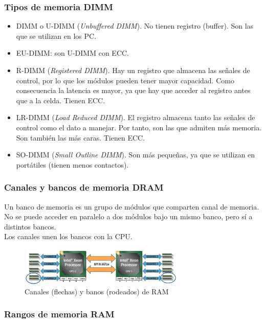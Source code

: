 \documentclass[12pt,spanish]{article}
\begin{document}
\subsubsection{Tipos de memoria DIMM}

\begin{itemize}
	\item DIMM o U-DIMM (\textit{Unbuffered DIMM}). No tienen registro (buffer). Son las que se utilizan en los PC.
	\item EU-DIMM: son U-DIMM con ECC.
	\item R-DIMM (\textit{Registered DIMM}). Hay un registro que almacena las señales de control, por lo que los módulos pueden tener mayor capacidad. Como consecuencia la latencia es mayor, ya que hay que acceder al registro antes que a la celda. Tienen ECC.
	\item LR-DIMM (\textit{Load Reduced DIMM}). El registro almacena tanto las señales de control como el dato a manejar. Por tanto, son las que admiten más memoria. Son también las más caras. Tienen ECC.
	\item SO-DIMM (\textit{Small Outline DIMM}). Son más pequeñas, ya que se utilizan en portátiles (tienen menos contactos).
\end{itemize}

\subsubsection{Canales y bancos de memoria DRAM}

Un banco de memoria es un grupo de módulos que comparten canal de memoria. No se puede acceder en paralelo a dos módulos bajo un mismo banco, pero sí a distintos bancos.\\

Los canales unen los bancos con la CPU.

\begin{figure}[H]
	\centering
	\includegraphics[width=0.7\textwidth]{rambanks.png}
	\caption{Canales (flechas) y banos (rodeados) de RAM}
\end{figure}

\subsubsection{Rangos de memoria RAM}
\end{document}
